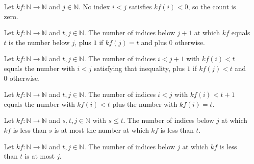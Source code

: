 \begin{theorem}
\label{Light.cntLt_zero_left}
\leanok
{}
Let $kf:\mathbb{N}\to\mathbb{N}$ and $j\in\mathbb{N}$. No index $i<j$ satisfies
$kf(i)<0$, so the count is zero.
\end{theorem}

\begin{theorem}
\label{Light.cntEq_succ}
\leanok
{}
Let $kf:\mathbb{N}\to\mathbb{N}$ and $t,j\in\mathbb{N}$. The number of indices below
$j+1$ at which $kf$ equals $t$ is the number below $j$, plus $1$ if $kf(j)=t$ and plus
$0$ otherwise.
\end{theorem}

\begin{theorem}
\label{Light.cntLt_succ_right}
\leanok
{}
Let $kf:\mathbb{N}\to\mathbb{N}$ and $t,j\in\mathbb{N}$. The number of indices $i<j+1$
with $kf(i)<t$ equals the number with $i<j$ satisfying that inequality, plus $1$ if
$kf(j)<t$ and $0$ otherwise.
\end{theorem}

\begin{theorem}
\label{Light.cntLt_succ_left}
\leanok
{}
Let $kf:\mathbb{N}\to\mathbb{N}$ and $t,j\in\mathbb{N}$. The number of indices $i<j$
with $kf(i)<t+1$ equals the number with $kf(i)<t$ plus the number with $kf(i)=t$.
\end{theorem}

\begin{theorem}
\label{Light.cntLt_mono_left}
\leanok
{}
Let $kf:\mathbb{N}\to\mathbb{N}$ and $s,t,j\in\mathbb{N}$ with $s\leq t$. The number of
indices below $j$ at which $kf$ is less than $s$ is at most the number at which $kf$ is
less than $t$.
\end{theorem}

\begin{theorem}
\label{Light.cntLt_le}
\leanok
{}
Let $kf:\mathbb{N}\to\mathbb{N}$ and $t,j\in\mathbb{N}$. The number of indices below $j$
at which $kf$ is less than $t$ is at most $j$.
\end{theorem}


